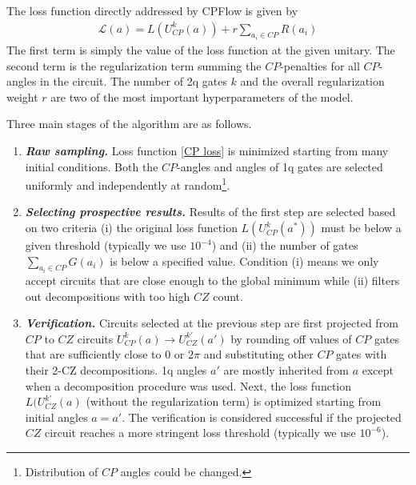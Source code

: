 \documentclass[amsfonts, amssymb, aps, nofootinbib]{revtex4-2}
\begin{document}
The loss function directly addressed by CPFlow is given by
\begin{align}
\mathcal{L}(a)=L(U^k_{CP}(a))+r\sum_{a_i\in CP} R(a_i) \label{CP loss}
\end{align}
The first term is simply the value of the loss function at the given unitary. The second term is the regularization term summing the $CP$-penalties for all $CP$-angles in the circuit. The number of 2q gates $k$ and the overall regularization weight $r$ are two of the most important hyperparameters of the model.

Three main stages of the algorithm are as follows.

\begin{enumerate}
\item \textit{\textbf{ Raw sampling.}} Loss function \eqref{CP loss} is minimized starting from many initial conditions. Both the $CP$-angles and angles of 1q gates are selected uniformly and independently at random\footnote{Distribution of $CP$ angles could be changed.}. 
\item \textit{\textbf{Selecting prospective results.}} Results of the first step are selected based on two criteria (i) the original loss function $L(U^k_{CP}(a^*))$ must be below a given threshold (typically we use $10^{-4}$) and (ii) the number of gates $\sum_{a_i\in CP}G(a_i)$ is below a specified value. Condition (i) means we only accept circuits that are close enough to the global minimum while (ii) filters out decompositions with too high $CZ$ count.
\item \textit{\textbf{Verification.}} Circuits selected at the previous step are first projected from $CP$ to $CZ$ circuits $U_{CP}^k(a)\to U_{CZ}^{k'}(a')$ by rounding off values of $CP$ gates that are sufficiently close to $0$ or $2\pi$ and substituting other $CP$ gates with their 2-CZ decompositions. 1q angles $a'$ are mostly inherited from $a$ except when a decomposition procedure was used. Next, the loss function $L(U_{CZ}^{k'}(a)$ (without the regularization term) is optimized starting from initial angles $a=a'$. The verification is considered successful if the projected $CZ$ circuit reaches a more stringent loss threshold (typically we use $10^{-6}$).
\end{enumerate}
\end{document}

